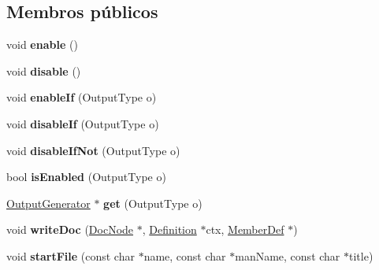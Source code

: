 \subsection*{Membros públicos}
\begin{DoxyCompactItemize}
\item 
\hypertarget{class_latex_generator_a486f22824bd83c5308a0d70ffac6f758}{void {\bfseries enable} ()}\label{class_latex_generator_a486f22824bd83c5308a0d70ffac6f758}

\item 
\hypertarget{class_latex_generator_a8cfbbe53c1cf6e3054736daea3044c0f}{void {\bfseries disable} ()}\label{class_latex_generator_a8cfbbe53c1cf6e3054736daea3044c0f}

\item 
\hypertarget{class_latex_generator_a4cb683868aced938e5825344efcabbac}{void {\bfseries enable\-If} (Output\-Type o)}\label{class_latex_generator_a4cb683868aced938e5825344efcabbac}

\item 
\hypertarget{class_latex_generator_a7631c8cb9b2794dd29fbf9fc4f4e3fdc}{void {\bfseries disable\-If} (Output\-Type o)}\label{class_latex_generator_a7631c8cb9b2794dd29fbf9fc4f4e3fdc}

\item 
\hypertarget{class_latex_generator_a50896e6fa0a1ae81a11e07bc2d86bcbb}{void {\bfseries disable\-If\-Not} (Output\-Type o)}\label{class_latex_generator_a50896e6fa0a1ae81a11e07bc2d86bcbb}

\item 
\hypertarget{class_latex_generator_a79a2b8ce4bca9910d02b7a54ea547aba}{bool {\bfseries is\-Enabled} (Output\-Type o)}\label{class_latex_generator_a79a2b8ce4bca9910d02b7a54ea547aba}

\item 
\hypertarget{class_latex_generator_a256fd8270e935e213d393fb88d0f3737}{\hyperlink{class_output_generator}{Output\-Generator} $\ast$ {\bfseries get} (Output\-Type o)}\label{class_latex_generator_a256fd8270e935e213d393fb88d0f3737}

\item 
\hypertarget{class_latex_generator_adbd55e51e886fc8520258d6a17038903}{void {\bfseries write\-Doc} (\hyperlink{class_doc_node}{Doc\-Node} $\ast$, \hyperlink{class_definition}{Definition} $\ast$ctx, \hyperlink{class_member_def}{Member\-Def} $\ast$)}\label{class_latex_generator_adbd55e51e886fc8520258d6a17038903}

\item 
\hypertarget{class_latex_generator_a642331f37add1aa818a86124a5fe4723}{void {\bfseries start\-File} (const char $\ast$name, const char $\ast$man\-Name, const char $\ast$title)}\label{class_latex_generator_a642331f37add1aa818a86124a5fe4723}


\end{DoxyCompactItemize}
